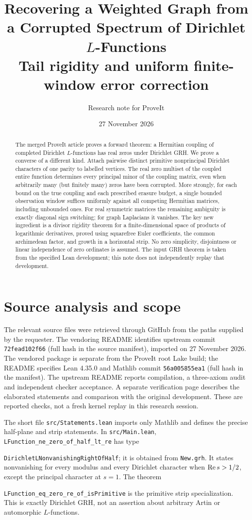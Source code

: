 \documentclass[11pt]{article}
\title{\bfseries Recovering a Weighted Graph from a Corrupted Spectrum of Dirichlet $L$-Functions\\[4pt]\large Tail rigidity and uniform finite-window error correction}
\author{Research note for ProveIt}
\date{27 November 2026}
\theoremstyle{definition}\newtheorem{definition}[theorem]{Definition}
\begin{document}
\setlength{\emergencystretch}{3em}
\maketitle
\begin{abstract}
The merged ProveIt article proves a forward theorem: a Hermitian coupling of completed Dirichlet $L$-functions has real zeros under Dirichlet GRH. We prove a converse of a different kind. Attach pairwise distinct primitive nonprincipal Dirichlet characters of one parity to labelled vertices. The real zero multiset of the coupled entire function determines every principal minor of the coupling matrix, even when arbitrarily many (but finitely many) zeros have been corrupted. More strongly, for each bound on the true coupling and each prescribed erasure budget, a single bounded observation window suffices uniformly against all competing Hermitian matrices, including unbounded ones. For real symmetric matrices the remaining ambiguity is exactly diagonal sign switching; for graph Laplacians it vanishes. The key new ingredient is a divisor rigidity theorem for a finite-dimensional space of products of logarithmic derivatives, proved using squarefree Euler coefficients, the common archimedean factor, and growth in a horizontal strip. No zero simplicity, disjointness or linear independence of zero ordinates is assumed. The input GRH theorem is taken from the specified Lean development; this note does not independently replay that development.
\end{abstract}

\section{Source analysis and scope}
The relevant source files were retrieved through GitHub from the paths supplied by the requester. The vendoring README \cite{vendor} identifies upstream commit \texttt{72fead102f66} (full hash in the source manifest), imported on 27 November 2026. The vendored package is separate from the ProveIt root Lake build; the README specifies Lean 4.35.0 and Mathlib commit \texttt{56a005855ea1} (full hash in the manifest). The upstream README reports compilation, a three-axiom audit and independent checker acceptance. A separate verification page \cite{verification} describes the elaborated statements and comparison with the original development. These are reported checks, not a fresh kernel replay in this research session.

The short file \texttt{src/Statements.lean} imports only Mathlib and defines the precise half-plane and strip statements. In \texttt{src/Main.lean}, \texttt{LFunction\_ne\_zero\_of\_half\_lt\_re} has type\par\noindent\texttt{DirichletLNonvanishingRightOfHalf}; it is obtained from \texttt{New.grh}. It states nonvanishing for every modulus and every Dirichlet character when $\operatorname{Re} s>1/2$, except the principal character at $s=1$. The theorem\par\noindent\texttt{LFunction\_eq\_zero\_re\_of\_isPrimitive} is the primitive strip specialization. This is exactly Dirichlet GRH, not an assertion about arbitrary Artin or automorphic $L$-functions.
\end{document}
